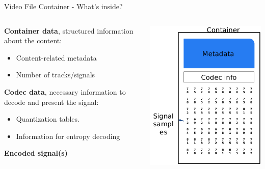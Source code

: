 \begin{tframe}{Video File Container - What's inside?}

\vspace{0.5cm}

\begin{minipage}{\textwidth}
\begin{columns}[T]

\begin{column}{0.55\textwidth}
\textbf{Container data}, structured information about the content:
\begin{itemize}
\item Content-related metadata
\item Number of tracks/signals
\end{itemize}

\vspace{0.2cm}

\textbf{Codec data}, necessary information to decode and present the signal:
\begin{itemize}
\item Quantization tables.
\item Information for entropy decoding
\end{itemize}

\vspace{0.2cm}

\textbf{Encoded signal(s)}
\end{column}

\begin{column}{0.45\textwidth}
\includegraphics[width=1\textwidth]{images/container.png}
\end{column}


\end{columns}
\end{minipage}
\end{tframe}

